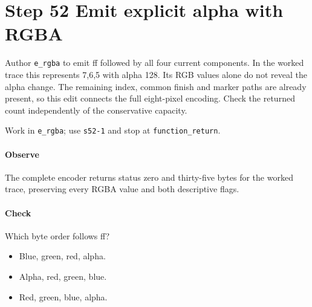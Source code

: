 \section{Step 52 Emit explicit alpha with RGBA}\label{qoi-s52}
Author \texttt{e\_rgba} to emit ff followed by all four current components. In the worked trace this represents 7,6,5 with alpha 128. Its RGB values alone do not reveal the alpha change. The remaining index, common finish and marker paths are already present, so this edit connects the full eight-pixel encoding. Check the returned count independently of the conservative capacity.

Work in \texttt{e\_rgba}; use \texttt{s52-1} and stop at \texttt{function\_return}.

\paragraph{Observe} The complete encoder returns status zero and thirty-five bytes for the worked trace, preserving every RGBA value and both descriptive flags.

\paragraph{Check} Which byte order follows ff?
\begin{itemize}
  \item[A.] Blue, green, red, alpha.
  \item[B.] Alpha, red, green, blue.
  \item[C.] Red, green, blue, alpha.
\end{itemize}
